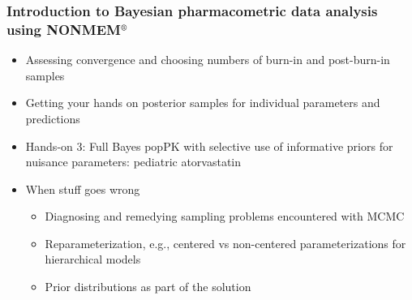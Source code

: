 \documentclass{beamer}
\begin{document}
\begin{frame}
  \frametitle{Introduction to Bayesian pharmacometric data analysis
    using NONMEM$^\text{\textregistered}$}
  
  \begin{itemize}
  \item Assessing convergence and choosing numbers of burn-in and
    post-burn-in samples
  \item Getting your hands on posterior samples for individual
    parameters and predictions
  \item Hands-on 3: Full Bayes popPK with selective use of informative
    priors for nuisance parameters: pediatric atorvastatin
  \end{itemize}
  \begin{itemize}
  \item When stuff goes wrong
    \begin{itemize}
    \item Diagnosing and remedying sampling problems encountered with
      MCMC
    \item Reparameterization, e.g., centered vs non-centered
      parameterizations for hierarchical models
    \item Prior distributions as part of the solution
    \end{itemize}
  \end{itemize}

\end{frame}
\end{document}
